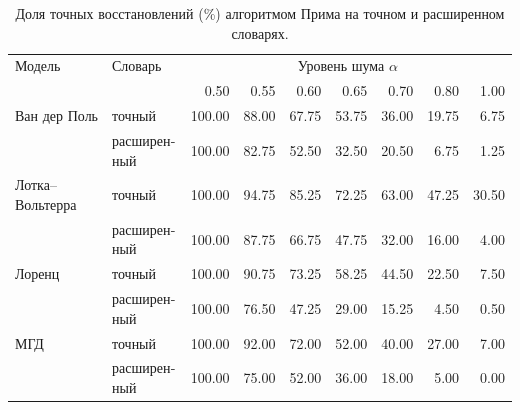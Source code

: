 \documentclass[12pt]{article}
\begin{document}
\begin{table}[!htbp]
  \centering
  \small
  \setlength{\tabcolsep}{4pt}
  \caption{\protect\foreignlanguage{russian}{Доля точных восстановлений (\%) алгоритмом Прима на точном и расширенном словарях.}}
  \label{tab:physical-prim-exact}
  \begin{otherlanguage}{russian}
  \begin{tabular}{llrrrrrrr}
  \toprule
  Модель & Словарь & \multicolumn{7}{c}{Уровень шума $\alpha$}\\
   &  & 0.50 & 0.55 & 0.60 & 0.65 & 0.70 & 0.80 & 1.00\\
  \midrule
  Ван дер Поль & точный & 100.00 & 88.00 & 67.75 & 53.75 & 36.00 & 19.75 & 6.75\\
   & расширенный & 100.00 & 82.75 & 52.50 & 32.50 & 20.50 & 6.75 & 1.25\\
  \addlinespace
  Лотка--Вольтерра & точный & 100.00 & 94.75 & 85.25 & 72.25 & 63.00 & 47.25 & 30.50\\
   & расширенный & 100.00 & 87.75 & 66.75 & 47.75 & 32.00 & 16.00 & 4.00\\
  \addlinespace
  Лоренц & точный & 100.00 & 90.75 & 73.25 & 58.25 & 44.50 & 22.50 & 7.50\\
   & расширенный & 100.00 & 76.50 & 47.25 & 29.00 & 15.25 & 4.50 & 0.50\\
  \addlinespace
  МГД & точный & 100.00 & 92.00 & 72.00 & 52.00 & 40.00 & 27.00 & 7.00\\
   & расширенный & 100.00 & 75.00 & 52.00 & 36.00 & 18.00 & 5.00 & 0.00\\
  \bottomrule
  \end{tabular}
  \end{otherlanguage}
\end{table}
\end{document}

